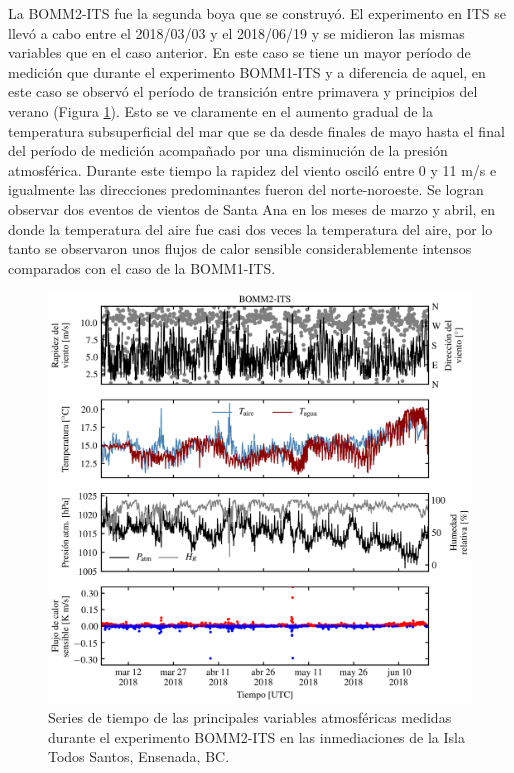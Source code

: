 \documentclass[11pt]{article}
\begin{document}
La BOMM2-ITS fue la segunda boya que se construyó. El experimento en ITS se
llevó a cabo entre el 2018/03/03 y el 2018/06/19 y se midieron las mismas
variables que en el caso anterior. En este caso se tiene un mayor período de
medición que durante el experimento BOMM1-ITS y a diferencia de aquel, en este
caso se observó el período de transición entre primavera y principios del verano
(Figura \ref{fig:bomm2_its_main_variables}). Esto se ve claramente en el aumento
gradual de la temperatura subsuperficial del mar que se da desde finales de mayo
hasta el final del período de medición acompañado por una disminución de la
presión atmosférica.  Durante este tiempo la rapidez del viento osciló entre 0 y
11 m/s e igualmente las direcciones predominantes fueron del norte-noroeste. Se
logran observar dos eventos de vientos de Santa Ana en los meses de marzo y
abril, en donde la temperatura del aire fue casi dos veces la temperatura del
aire, por lo tanto se observaron unos flujos de calor sensible considerablemente
intensos comparados con el caso de la BOMM1-ITS.

\begin{figure}[htpb]
  \centering
  \includegraphics[width=0.85\linewidth]{../figures/bomm2_its_main_variables.png}
  \caption{
    Series de tiempo de las principales variables atmosféricas medidas durante
    el experimento BOMM2-ITS en las inmediaciones de la Isla Todos Santos,
    Ensenada, BC.
  }
  \label{fig:bomm2_its_main_variables}
\end{figure}
\end{document}

